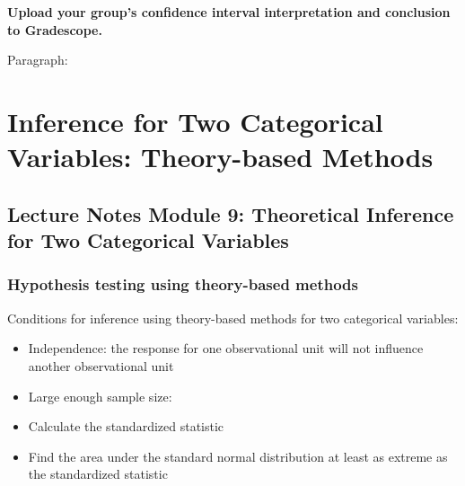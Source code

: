 \documentclass[
]{report}
\providecommand{\tightlist}{%
  \setlength{\itemsep}{0pt}\setlength{\parskip}{0pt}}
\begin{document}
\textbf{Upload your group's confidence interval interpretation and conclusion to Gradescope.}

\newpage

Paragraph:

\newpage

\hypertarget{inference-for-two-categorical-variables-theory-based-methods}{%
\chapter{Inference for Two Categorical Variables: Theory-based Methods}\label{inference-for-two-categorical-variables-theory-based-methods}}

\hypertarget{lecture-notes-module-9-theoretical-inference-for-two-categorical-variables}{%
\section{Lecture Notes Module 9: Theoretical Inference for Two Categorical Variables}\label{lecture-notes-module-9-theoretical-inference-for-two-categorical-variables}}


\hypertarget{hypothesis-testing-using-theory-based-methods}{%
\subsection*{Hypothesis testing using theory-based methods}\label{hypothesis-testing-using-theory-based-methods}}

Conditions for inference using theory-based methods for two categorical variables:

\begin{itemize}
\tightlist
\item
  Independence: the response for one observational unit will not influence another observational unit
\end{itemize}

\vspace{0.2in}

\begin{itemize}
\tightlist
\item
  Large enough sample size:
\end{itemize}

\vspace{1in}

\begin{itemize}
\item
  Calculate the standardized statistic
\item
  Find the area under the standard normal distribution at least as extreme as the standardized statistic
\end{itemize}
\end{document}
